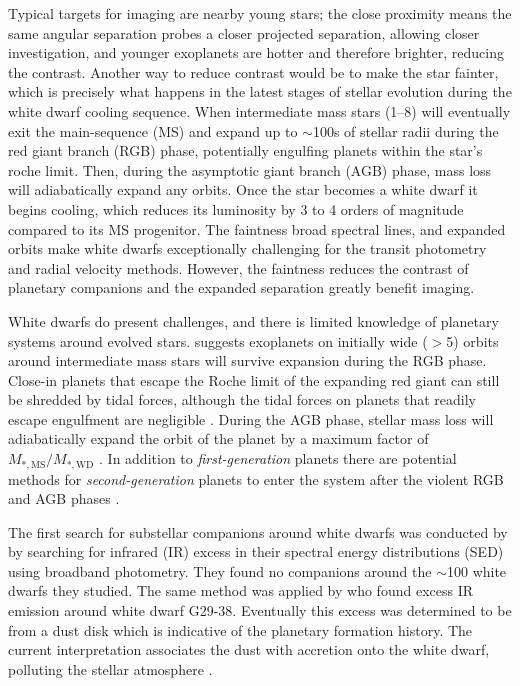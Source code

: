 \documentclass[twocolumn]{aastex631}
\begin{document}
Typical targets for imaging are nearby young stars; the close proximity means the same angular separation probes a closer projected separation, allowing closer investigation, and younger exoplanets are hotter and therefore brighter, reducing the contrast. Another way to reduce contrast would be to make the star fainter, which is precisely what happens in the latest stages of stellar evolution during the white dwarf cooling sequence. When intermediate mass stars (\qtyrange{1}{8}{\solarmass}) will eventually exit the main-sequence (MS) and expand up to $\sim$100s of stellar radii during the red giant branch (RGB) phase, potentially engulfing planets within the star's roche limit. Then, during the asymptotic giant branch (AGB) phase, mass loss will adiabatically expand any orbits. Once the star becomes a white dwarf it begins cooling, which reduces its luminosity by 3 to 4 orders of magnitude compared to its MS progenitor. The faintness broad spectral lines, and expanded orbits make white dwarfs exceptionally challenging for the transit photometry and radial velocity methods. However, the faintness reduces the contrast of planetary companions and the expanded separation greatly benefit imaging.

White dwarfs do present challenges, and there is limited knowledge of planetary systems around evolved stars. \citet{burleigh_imaging_2002,veras_post-main-sequence_2016} suggests exoplanets on initially wide ($>$\qty{5}{\au}) orbits around intermediate mass stars will survive expansion during the RGB phase. Close-in planets that escape the Roche limit of the expanding red giant can still be shredded by tidal forces, although the tidal forces on planets that readily escape engulfment are negligible \citep{nordhaus_orbits_2013}. During the AGB phase, stellar mass loss will adiabatically expand the orbit of the planet by a maximum factor of $M_{*,\mathrm{MS}}/M_{*,\mathrm{WD}}$ \citep{jeans_cosmogonic_1924}. In addition to \textit{first-generation} planets there are potential methods for \textit{second-generation} planets to enter the system after the violent RGB and AGB phases \citep{perets_second_2010}.

The first search for substellar companions around white dwarfs was conducted by \citet{probst_infrared_1983} by searching for infrared (IR) excess in their spectral energy distributions (SED) using broadband photometry. They found no companions around the $\sim$100 white dwarfs they studied. The same method was applied by \citet{zuckerman_excess_1987} who found excess IR emission around white dwarf G29-38. Eventually this excess was determined to be from a dust disk \citep{telesco_observations_1990} which is indicative of the planetary formation history. The current interpretation associates the dust with accretion onto the white dwarf, polluting the stellar atmosphere \citep{koester_metals_1997}.
\end{document}
